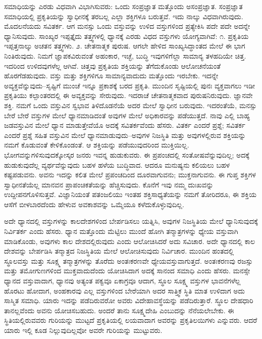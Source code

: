 ಸಮಾಧಿಯನ್ನು ಎರಡು ವಿಧವಾಗಿ ವಿಭಾಗಿಸುವರು: ಒಂದು ಸಂಪ್ರಜ್ಞಾತ ಮತ್ತೊಂದು ಅಸಂಪ್ರಜ್ಞಾತ. ಸಂಪ್ರಜ್ಞಾತ ಸಮಾಧಿಯಲ್ಲಿ ಪ್ರಕೃತಿಯನ್ನು ಸ್ವಾಧೀನಕ್ಕೆ ತರಬಲ್ಲ ಎಲ್ಲಾ ಶಕ್ತಿಗಳೂ ಬರುತ್ತವೆ. ಇದು ನಾಲ್ಕು ವಿಧವಾಗಿರುವುದು. ಮೊದಲನೆಯದು ಸವಿತರ್ಕ. ಆಗ ಮನಸ್ಸು ಒಂದು ವಸ್ತುವನ್ನು ಉಳಿದ ವಸ್ತುಗಳಿಂದ ಪ್ರತ್ಯೇಕಿಸಿ ಪದೇ ಪದೇ ಅದನ್ನೇ ಧ್ಯಾನಿಸುವುದು. ಸಾಂಖ್ಯರ ಇಪ್ಪತ್ತೈದು ತತ್ತ್ವಗಳಲ್ಲಿ ಧ್ಯಾನಕ್ಕೆ ಎರಡು ವಿಧದ ವಸ್ತುಗಳು ಯೋಗ್ಯವಾಗಿವೆ: ೧. ಪ್ರಕೃತಿಯ ಇಪ್ಪತ್ತನಾಲ್ಕು ಅಚತನ ತತ್ತ್ವಗಳು. ೨. ಚೇತನಾತ್ಮಕ ಪುರುಷ. ಆಗಲೇ ಹೇಳಿದ ಸಾಂಖ್ಯಸಿದ್ಧಾಂತದ ಮೇಲೆ ಈ ಭಾಗ ನಿಂತಿರುವುದು. ನಿಮಗೆ ಜ್ಞಾಪಕವಿರುವಂತೆ ಅಹಂಕಾರ, ಇಚ್ಛೆ, ಬುದ್ಧಿ ಇವುಗಳಿಗೆಲ್ಲಾ ಸಾಮಾನ್ಯ ತಳಹದಿಯೇ ಚಿತ್ತ. ಇದರಿಂದ ಉಳಿದವುಗಳೆಲ್ಲ ಆಗಿವೆ. ಚಿತ್ತವು ಪ್ರಕೃತಿಯ ಶಕ್ತಿಯನ್ನು ತೆಗೆದುಕೊಂಡು ಆಲೋಚನೆಯಂತೆ ಹೊರಗೆಡಹುವುದು. ವಸ್ತು ಮತ್ತು ಶಕ್ತಿಗಳಿಗೂ ಸಾಮಾನ್ಯವಾದುದು ಮತ್ತೊಂದು ಇರಬೇಕು. ಇದನ್ನೇ ಅವ್ಯಕ್ತವೆನ್ನುವುದು–ಸೃಷ್ಟಿಗೆ ಮುಂಚೆ ಇನ್ನೂ ಪ್ರಕಾಶಕ್ಕೆ ಬರದ ಪ್ರಕೃತಿ. ಮುಂದಿನ ಸೃಷ್ಟಿಯಲ್ಲಿ ಪುನಃ ವ್ಯಕ್ತವಾಗಲು ಇಡೀ ಪ್ರಕೃತಿಯು ಕಲ್ಪಾಂತರದಲ್ಲಿ ಈ ಅವ್ಯಕ್ತವನ್ನು ಸೇರುವುದು. ಇದರಾಚೆ ಚೇತನಾತ್ಮಕವಾದ ಪುರುಷನಿರುವುದು. ಜ್ಞಾನವೇ ಶಕ್ತಿ. ನಮಗೆ ಒಂದು ವಸ್ತುವಿನ ಸ್ವಭಾವ ತಿಳಿದೊಡನೆಯೆ ಅದರ ಮೇಲೆ ಸ್ವಾಧೀನ ಬರುವುದು. ಇದರಂತೆಯೆ, ಮನಸ್ಸು ಬೇರೆ ಬೇರೆ ವಸ್ತುಗಳ ಮೇಲೆ ಧ್ಯಾನಮಾಡಿದಂತೆ ಅವುಗಳ ಮೇಲೆ ಅಧಿಕಾರವನ್ನು ಪಡೆಯುತ್ತದೆ. ನಾವು ಎಲ್ಲಿ ಬಾಹ್ಯ ಜಡವಸ್ತುವಿನ ಮೇಲೆ ಧ್ಯಾನ ಮಾಡುತ್ತೇವೆಯೊ ಅದಕ್ಕೆ ಸವಿತರ್ಕವೆಂದು ಹೆಸರು. ವಿತರ್ಕ ಎಂದರೆ ಪ್ರಶ್ನೆ; ಸವಿತರ್ಕ ಎಂದರೆ ಪ್ರಶ್ನೆ ಸಹಿತ ವಸ್ತುವಿನ ಮೇಲೆ ಧ್ಯಾನಮಾಡುವುದು–ಅವುಗಳ ನಿಜಸ್ಥಿತಿ ಮತ್ತು ಅವುಗಳಲ್ಲಿರುವ ಶಕ್ತಿಯನ್ನು ನಮಗೆ ಕೊಡುವಂತೆ ಕೇಳಿಕೊಂಡಂತೆ. ಆ ಶಕ್ತಿಯನ್ನು ಪಡೆಯುವುದರಿಂದ ಮುಕ್ತಿಯಿಲ್ಲ. ಭೋಗವನ್ನುಗಳಿಸುವುದಕ್ಕೋಸ್ಕರ ಜನರು ಇವನ್ನ ಹುಡುಕುವರು. ಈ ಪ್ರಪಂಚದಲ್ಲಿ ಸಂತೋಷವೆನ್ನುವುದಿಲ್ಲ; ಅದಕ್ಕೆ ಹುಡುಕುವುದೆಲ್ಲ ವ್ಯರ್ಥವೆನ್ನುವುದು ಬಹಳ ಹಳೆಯ ಬುದ್ಧಿವಾದ. ಆದರೂ ಮನುಷ್ಯನು ಕಲಿಯಲು ಬಹಳ ಕಷ್ಟಪಡುವನು. ಅವನು ಇದನ್ನು ಕಲಿತ ಮೇಲೆ ಪ್ರಪಂಚದಿಂದ ದೂರವಾಗುವನು; ಮುಕ್ತನಾಗುವನು. ಈ ಗುಪ್ತ ಶಕ್ತಿಗಳ ಸ್ವಾಧೀನತೆಯೆಲ್ಲ ಮಾನವನ ಪ್ರಾಪಂಚಿಕತೆಯನ್ನು ಹೆಚ್ಚಿಸುವುದು. ಕೊನೆಗೆ ಇವು ನಮ್ಮ ದುಃಖವನ್ನು ಉದ್ದೀಪನಗೊಳಿಸುತ್ತವೆ. ವಿಜ್ಞಾನಿಯಂತೆ ಪತಂಜಲಿಯು ಇಂತಹ ಶಕ್ತಿಸಾಧ್ಯತೆಯನ್ನು ನಮಗೆ ತೋರಿದರೂ, ಈ ಶಕ್ತಿಯ ಆಸೆಗೆ ಬೀಳಬಾರದೆಂದು ಹೇಳುವ ಅವಕಾಶವನ್ನು ಒಮ್ಮೆಯೂ ಕಳೆದುಕೊಳ್ಳುವುದಿಲ್ಲ. 

ಅದೇ ಧ್ಯಾನದಲ್ಲಿ ವಸ್ತುಗಳನ್ನು ಕಾಲದೇಶಗಳಿಂದ ಬೇರ್ಪಡಿಸಲು ಯತ್ನಿಸಿ, ಅವುಗಳ ನಿಜಸ್ಥಿತಿಯ ಮೇಲೆ ಧ್ಯಾನಿಸುವುದಕ್ಕೆ ನಿರ್ವಿತರ್ಕ ಎಂದು ಹೆಸರು. ಧ್ಯಾನ ಮತ್ತೊಂದು ಮೆಟ್ಟಿಲು ಮುಂದೆ ಹೋಗಿ ತನ್ಮಾತ್ರಗಳನ್ನು ಧ್ಯೇಯ ವಸ್ತುವಾಗಿ ಮಾಡಿಕೊಂಡು, ಅವುಗಳು ಕಾಲ ದೇಶದಲ್ಲಿರುವುದು ಎಂದು ಆಲೋಚಿಸಿದರೆ ಅದು ಸವಿಚಾರ. ಅದೇ ಧ್ಯಾನದಲ್ಲಿ ಕಾಲ ದೇಶವನ್ನು ಬೇರ್ಪಡಿಸಿ ತನ್ಮಾತ್ರದ ನಿಜಸ್ಥಿತಿಯ ಮೇಲೆ ಆಲೋಚಿಸುವುದು ನಿರ್ವಿಚಾರ. ಮುಂದಿನ ಹಂತದಲ್ಲಿ ಸ್ಥೂಲವಸ್ತು ಮತ್ತು ಸೂಕ್ಷ್ಮ ತನ್ಮಾತ್ರಗಳನ್ನು ತೊರೆದು ಅಂತಃಕರಣವೇ ಧ್ಯೇಯವಸ್ತುವಾಗುತ್ತದೆ. ಅಂತಃಕರಣವು ರಜಸ್ಸು ಮತ್ತು ತಮೋಗುಣಗಳಿಂದ ಮುಕ್ತವಾದುದೆಂದು ಯೋಚಿಸಿದಾಗ ಅದಕ್ಕೆ ಸಾನಂದ ಸಮಾಧಿ ಎಂದು ಹೆಸರು. ಮನಸ್ಸೇ ಧ್ಯಾನದ ವಸ್ತುವಾದಾಗ, ಧ್ಯಾನವು ಅತ್ಯಂತ ಪಕ್ವವೂ ಏಕಾಗ್ರವೂ ಆದಾಗ, ಸ್ಥೂಲ ಸೂಕ್ಷ್ಮ ವಸ್ತುಗಳ ಭಾವನೆಗಳೆಲ್ಲ ಹೊರಟು ಹೋದಾಗ, ಅಂಹಕಾರವು ಎಲ್ಲ ವಸ್ತುಗಳಿಂದ ಬೇರೆಯಾಗಿ ಅದರ ಸಾತ್ತ್ವಿಕ ಸ್ಥಿತಿ ಮಾತ ಉಳಿದಾಗ ಅದು ಸಾಸ್ಮಿತ ಸಮಾಧಿ. ಯಾರು ಇದನ್ನು ಪಡೆದಿರುವರೋ ಅವರು ವಿದೇಹಾವಸ್ಥೆಯನ್ನು ಪಡೆದಿರುತ್ತಾರೆ. ಸ್ಥೂಲ ದೇಹಧಾರಿ ತಾನಲ್ಲವೆಂದು ಅವನು ಯೋಚಿಸಬಹುದು. ಅಂದರೆ ತಾನು ಸೂಕ್ಷ್ಮದೇಹಿ ಎಂಬುದನ್ನು ನೆನೆಯಲೇಬೇಕು. ಈ ಸ್ಥಿತಿಯಲ್ಲಿರುವವರು ಗುರಿಯನ್ನು ಮುಟ್ಟದೆ ಪ್ರಕೃತಿಯಲ್ಲಿ ಲಯವಾದಾಗ ಅವರನ್ನು ಪ್ರಕೃತಿಲಯಿಗಳು ಎನ್ನುವರು. ಆದರೆ ಯಾರು ಇಲ್ಲಿ ಕೂಡ ನಿಲ್ಲುವುದಿಲ್ಲವೋ ಅವರೇ ಗುರಿಯನ್ನು ಮುಟ್ಟುವರು. 

